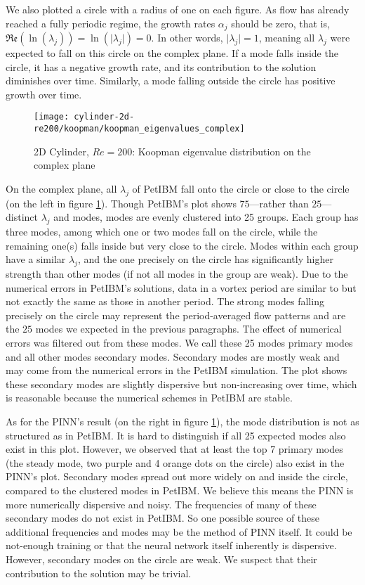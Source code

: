 We also plotted a circle with a radius of one on each figure.
As flow has already reached a fully periodic regime, the growth rates $\alpha_j$ should be zero, that is, $\mathfrak{Re}\left(\ln\left(\lambda_j\right)\right) = \ln\left(\lvert \lambda_j \rvert\right) = 0$.
In other words, $\lvert \lambda_j \rvert = 1$, meaning all $\lambda_j$ were expected to fall on this circle on the complex plane.
If a mode falls inside the circle, it has a negative growth rate, and its contribution to the solution diminishes over time.
Similarly, a mode falling outside the circle has positive growth over time.

\begin{figure}[hbt!]
    \centering
    \texttt{[image: cylinder-2d-re200/koopman/koopman\_eigenvalues\_complex]}
    \caption{2D Cylinder, $Re=200$: Koopman eigenvalue distribution on the complex plane}
    \label{fig:koopman-eigval-dist}
\end{figure}

On the complex plane, all $\lambda_j$ of PetIBM fall onto the circle or close to the circle (on the left in figure \ref{fig:koopman-eigval-dist}).
Though PetIBM's plot shows $75$---rather than $25$---distinct $\lambda_j$ and modes, modes are evenly clustered into 25 groups.
Each group has three modes, among which one or two modes fall on the circle, while the remaining one(s) falls inside but very close to the circle.
Modes within each group have a similar $\lambda_j$, and the one precisely on the circle has significantly higher strength than other modes (if not all modes in the group are weak).
Due to the numerical errors in PetIBM's solutions, data in a vortex period are similar to but not exactly the same as those in another period.
The strong modes falling precisely on the circle may represent the period-averaged flow patterns and are the $25$ modes we expected in the previous paragraphs. 
The effect of numerical errors was filtered out from these modes.
We call these 25 modes primary modes and all other modes secondary modes.
Secondary modes are mostly weak and may come from the numerical errors in the PetIBM simulation.
The plot shows these secondary modes are slightly dispersive but non-increasing over time, which is reasonable because the numerical schemes in PetIBM are stable.

As for the PINN's result (on the right in figure \ref{fig:koopman-eigval-dist}), the mode distribution is not as structured as in PetIBM.
It is hard to distinguish if all 25 expected modes also exist in this plot.
However, we observed that at least the top 7 primary modes (the steady mode, two purple and 4 orange dots on the circle) also exist in the PINN's plot.
Secondary modes spread out more widely on and inside the circle, compared to the clustered modes in PetIBM.
We believe this means the PINN is more numerically dispersive and noisy.
The frequencies of many of these secondary modes do not exist in PetIBM.
So one possible source of these additional frequencies and modes may be the method of PINN itself.
It could be not-enough training or that the neural network itself inherently is dispersive. 
However, secondary modes on the circle are weak.
We suspect that their contribution to the solution may be trivial.

